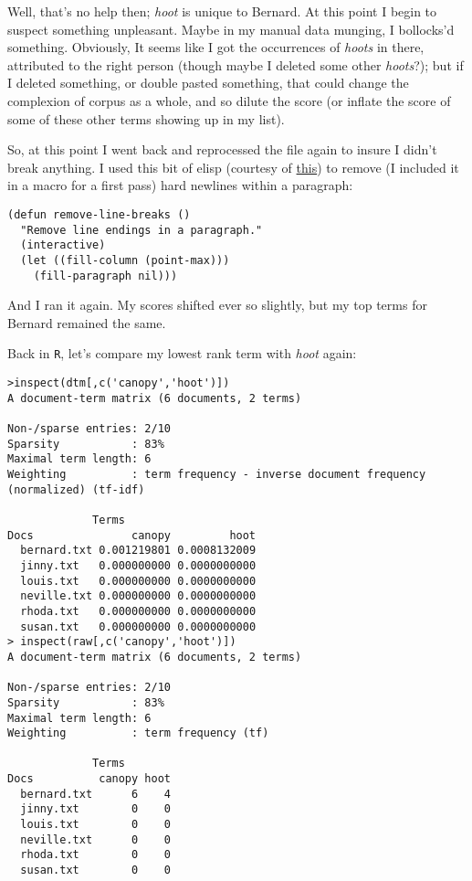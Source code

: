 \documentclass[
  12pt,
]{article}
\begin{document}
Well, that's no help then; \emph{hoot} is unique to Bernard. At this
point I begin to suspect something unpleasant. Maybe in my manual data
munging, I bollocks'd something. Obviously, It seems like I got the
occurrences of \emph{hoots} in there, attributed to the right person
(though maybe I deleted some other \emph{hoots}?); but if I deleted
something, or double pasted something, that could change the complexion
of corpus as a whole, and so dilute the score (or inflate the score of
some of these other terms showing up in my list).

So, at this point I went back and reprocessed the file again to insure I
didn't break anything. I used this bit of elisp (courtesy of
\href{http://lists.gnu.org/archive/html/help-gnu-emacs/2010-05/msg00586.html}{this})
to remove (I included it in a macro for a first pass) hard newlines
within a paragraph:

\begin{verbatim}
(defun remove-line-breaks ()
  "Remove line endings in a paragraph."
  (interactive)
  (let ((fill-column (point-max)))
    (fill-paragraph nil)))
\end{verbatim}

And I ran it again. My scores shifted ever so slightly, but my top terms
for Bernard remained the same.

Back in \texttt{R}, let's compare my lowest rank term with \emph{hoot}
again:

\begin{verbatim}
>inspect(dtm[,c('canopy','hoot')])
A document-term matrix (6 documents, 2 terms)

Non-/sparse entries: 2/10
Sparsity           : 83%
Maximal term length: 6 
Weighting          : term frequency - inverse document frequency (normalized) (tf-idf)

             Terms
Docs               canopy         hoot
  bernard.txt 0.001219801 0.0008132009
  jinny.txt   0.000000000 0.0000000000
  louis.txt   0.000000000 0.0000000000
  neville.txt 0.000000000 0.0000000000
  rhoda.txt   0.000000000 0.0000000000
  susan.txt   0.000000000 0.0000000000
> inspect(raw[,c('canopy','hoot')])
A document-term matrix (6 documents, 2 terms)

Non-/sparse entries: 2/10
Sparsity           : 83%
Maximal term length: 6 
Weighting          : term frequency (tf)

             Terms
Docs          canopy hoot
  bernard.txt      6    4
  jinny.txt        0    0
  louis.txt        0    0
  neville.txt      0    0
  rhoda.txt        0    0
  susan.txt        0    0
\end{verbatim}
\end{document}
